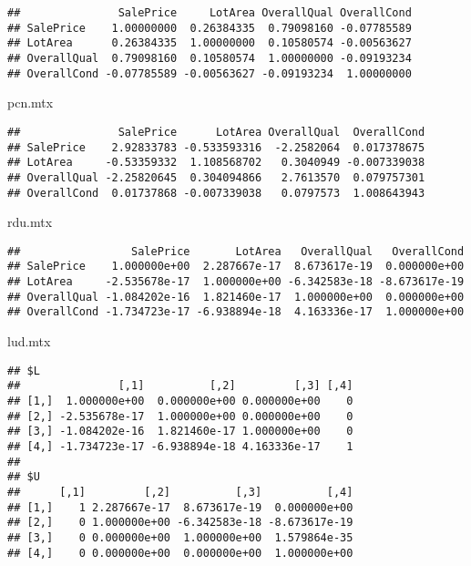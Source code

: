 \documentclass[
]{article}
\newenvironment{Shaded}{\begin{snugshade}}{\end{snugshade}}
\newcommand{\NormalTok}[1]{#1}
\begin{document}
\begin{verbatim}
##               SalePrice     LotArea OverallQual OverallCond
## SalePrice    1.00000000  0.26384335  0.79098160 -0.07785589
## LotArea      0.26384335  1.00000000  0.10580574 -0.00563627
## OverallQual  0.79098160  0.10580574  1.00000000 -0.09193234
## OverallCond -0.07785589 -0.00563627 -0.09193234  1.00000000
\end{verbatim}

\begin{Shaded}
\begin{Highlighting}[]
\NormalTok{pcn.mtx}
\end{Highlighting}
\end{Shaded}

\begin{verbatim}
##               SalePrice      LotArea OverallQual  OverallCond
## SalePrice    2.92833783 -0.533593316  -2.2582064  0.017378675
## LotArea     -0.53359332  1.108568702   0.3040949 -0.007339038
## OverallQual -2.25820645  0.304094866   2.7613570  0.079757301
## OverallCond  0.01737868 -0.007339038   0.0797573  1.008643943
\end{verbatim}

\begin{Shaded}
\begin{Highlighting}[]
\NormalTok{rdu.mtx}
\end{Highlighting}
\end{Shaded}

\begin{verbatim}
##                 SalePrice       LotArea   OverallQual   OverallCond
## SalePrice    1.000000e+00  2.287667e-17  8.673617e-19  0.000000e+00
## LotArea     -2.535678e-17  1.000000e+00 -6.342583e-18 -8.673617e-19
## OverallQual -1.084202e-16  1.821460e-17  1.000000e+00  0.000000e+00
## OverallCond -1.734723e-17 -6.938894e-18  4.163336e-17  1.000000e+00
\end{verbatim}

\begin{Shaded}
\begin{Highlighting}[]
\NormalTok{lud.mtx}
\end{Highlighting}
\end{Shaded}

\begin{verbatim}
## $L
##               [,1]          [,2]         [,3] [,4]
## [1,]  1.000000e+00  0.000000e+00 0.000000e+00    0
## [2,] -2.535678e-17  1.000000e+00 0.000000e+00    0
## [3,] -1.084202e-16  1.821460e-17 1.000000e+00    0
## [4,] -1.734723e-17 -6.938894e-18 4.163336e-17    1
## 
## $U
##      [,1]         [,2]          [,3]          [,4]
## [1,]    1 2.287667e-17  8.673617e-19  0.000000e+00
## [2,]    0 1.000000e+00 -6.342583e-18 -8.673617e-19
## [3,]    0 0.000000e+00  1.000000e+00  1.579864e-35
## [4,]    0 0.000000e+00  0.000000e+00  1.000000e+00
\end{verbatim}
\end{document}
